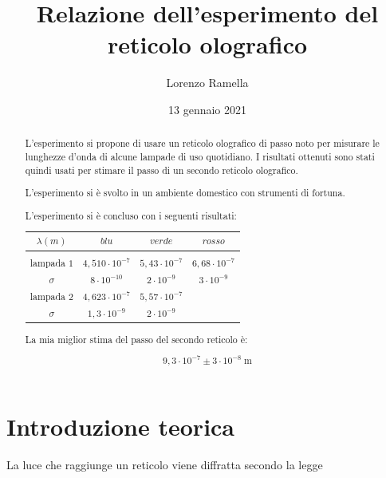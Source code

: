 \documentclass{article}
\title{Relazione dell'esperimento del reticolo olografico}
\author{Lorenzo Ramella}
\date{13 gennaio 2021}
\begin{document}
\maketitle

\begingroup
{}
\begin{abstract}
L’esperimento si propone di usare un reticolo olografico di passo noto per misurare le lunghezze d'onda di alcune lampade di uso quotidiano. I risultati ottenuti sono stati quindi usati per stimare il passo di un secondo reticolo olografico.

L'esperimento si è svolto in un ambiente domestico con strumenti di fortuna.

L'esperimento si è concluso con i seguenti risultati:

\vspace{4mm}

\begin{center}
\begin{tabular}{ || c | c | c | c || }
  \hline
  $\lambda (m)$ & $blu$ & $verde$ & $rosso$ \\
  \hline \hline &&& \\ [-0.9ex]
  lampada $1$ & $4,510 \cdot 10^{-7}$ & $5,43 \cdot 10^{-7}$ & $6,68 \cdot 10^{-7}$ \\
  $\sigma$ & $8 \cdot 10^{-10}$ & $2 \cdot 10^{-9}$ & $3 \cdot 10^{-9}$ \\
  lampada $2$ & $4,623 \cdot 10^{-7}$ & $5,57 \cdot 10^{-7}$ & \\
  $\sigma$ & $1,3 \cdot 10^{-9}$ & $2 \cdot 10^{-9}$ & \\
  \hline
\end{tabular}
\end{center}

\vspace{4mm}

La mia miglior stima del passo del secondo reticolo è:

\[9,3 \cdot 10^{-7} \pm 3 \cdot 10^{-8} \; \textrm{m}\]

\end{abstract}
\endgroup
{}
\tableofcontents

\clearpage

\section{Introduzione teorica}

La luce che raggiunge un reticolo viene diffratta secondo la legge 
\end{document}
